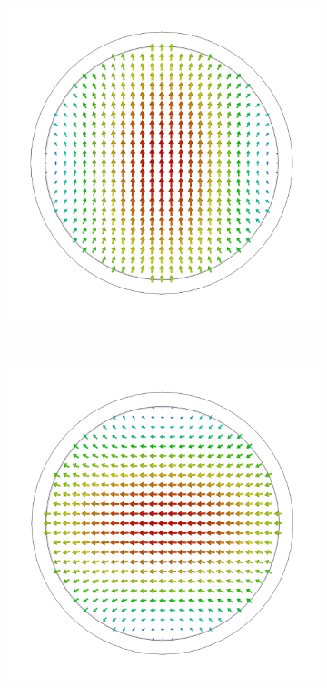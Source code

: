 \documentclass[14pt,a4paper]{ntust_report}
\begin{document}
\begin{figure}
\begin{subfigure}{.45\textwidth}
        \caption{\label{fig:square-waveguide-mode2}}
    \end{subfigure}
    \\
    \begin{subfigure}{.45\textwidth}
        \centering
        \includegraphics[width=\textwidth]{src/waveguide_circular_mode1.png}
        \caption{\label{fig:circular-waveguide-mode1}}
    \end{subfigure}
    ~
    \begin{subfigure}{.45\textwidth}
        \centering
        \includegraphics[width=\textwidth]{src/waveguide_circular_mode2.png}

\end{subfigure}
\end{figure}
\end{document}
